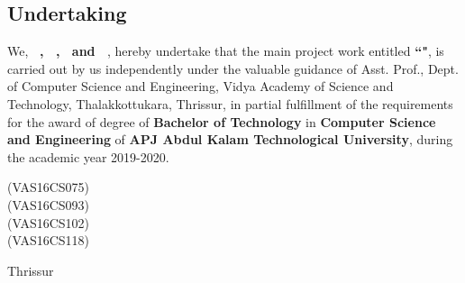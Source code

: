%
%
%
%


\begin{titlepage}



\chapter*{\centering Undertaking}
%


\quad \quad We, {\bf \vauthora\ , \vauthorb\ , \vauthorc\  and \vauthord\ }, hereby undertake that the main project work entitled {\bf ``\vtitle"}, is carried out by us independently under the valuable guidance of {\bf \vguide} Asst. Prof., Dept. of Computer Science and Engineering, Vidya Academy of Science and Technology, Thalakkottukara, Thrissur, in partial fulfillment of the requirements for the award of degree of {\bf Bachelor of Technology} in {\bf Computer Science and Engineering} of {\bf APJ Abdul Kalam Technological University}, during the academic year 2019-2020.\\[5 cm]






\begin{flushright}
{\bf \vauthora } (VAS16CS075)\\
{\bf \vauthorb } (VAS16CS093)\\ 
{\bf \vauthorc } (VAS16CS102)\\ 
{\bf \vauthord } (VAS16CS118)\\[0.4cm]
\end{flushright}
\noindent Thrissur \hfill  \\ 
\vdate 


\end{titlepage}



